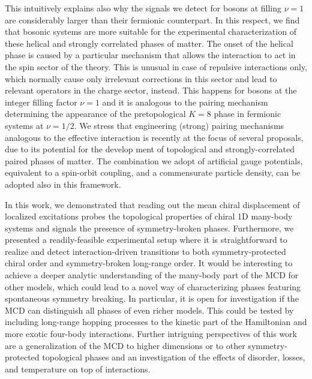 This intuitively explains also why the signals we detect for bosons at filling $\nu = 1$ are considerably larger than their fermionic counterpart.
In this respect, we find that bosonic systems are more suitable for the experimental characterization of these helical and strongly correlated phases of matter.
The onset of the helical phase is caused by a particular mechanism that allows the interaction to act in the spin sector of the theory.
This is unusual in case of repulsive interactions only, which normally cause only irrelevant corrections in this sector and lead to relevant operators in the charge sector, instead.
This happens for bosons at the integer filling factor $\nu=1$ and it is analogous to the pairing mechanism determining the appearance of the pretopological $K = 8$ phase in fermionic systems at $\nu=1/2$.
We stress that engineering (strong) pairing mechanisms analogous to the effective interaction is recently at the focus of several proposals, due to its potential for the develop ment of topological and strongly-correlated paired phases of matter.
The combination we adopt of artificial gauge potentials, equivalent to a spin-orbit coupling, and a commensurate particle density, can be adopted also in this framework.

In this work, we demonstrated that reading out the mean chiral displacement of localized excitations probes the topological properties of chiral 1D many-body systems and signals the presence of symmetry-broken phases.
Furthermore, we presented a readily-feasible experimental setup where it is straightforward to realize and detect interaction-driven transitions to both symmetry-protected chiral order and symmetry-broken long-range order.
It would be interesting to achieve a deeper analytic understanding of the many-body part of the MCD for other models, which could lead to a novel way of characterizing phases featuring spontaneous symmetry breaking.
In particular, it is open for investigation if the MCD can distinguish all phases of even richer models.
This could be tested by including long-range hopping processes to the kinetic part of the Hamiltonian and more exotic four-body interactions.
Further intriguing perspectives of this work are a generalization of the MCD to higher dimensions or to other symmetry-protected topological phases and an investigation of the effects of disorder, losses, and temperature on top of interactions.
